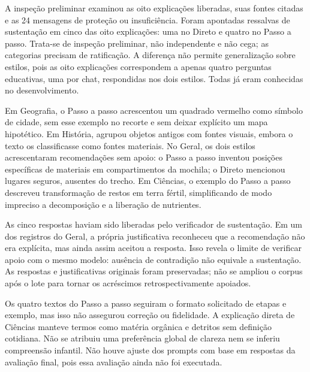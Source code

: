 \begin{table}[htbp]\centering\small\SingleSpacing
\caption{Rotas do lote GK-P2.1-dev, com denominador próprio}\label{tab:multichat}

\end{table}

A inspeção preliminar examinou as oito explicações liberadas, suas fontes citadas e as 24 mensagens de proteção ou insuficiência. Foram apontadas ressalvas de sustentação em cinco das oito explicações: uma no Direto e quatro no Passo a passo. Trata-se de inspeção preliminar, não independente e não cega; as categorias precisam de ratificação. A diferença não permite generalização sobre estilos, pois as oito explicações correspondem a apenas quatro perguntas educativas, uma por chat, respondidas nos dois estilos. Todas já eram conhecidas no desenvolvimento.

Em Geografia, o Passo a passo acrescentou um quadrado vermelho como símbolo de cidade, sem esse exemplo no recorte e sem deixar explícito um mapa hipotético. Em História, agrupou objetos antigos com fontes visuais, embora o texto os classificasse como fontes materiais. No Geral, os dois estilos acrescentaram recomendações sem apoio: o Passo a passo inventou posições específicas de materiais em compartimentos da mochila; o Direto mencionou lugares seguros, ausentes do trecho. Em Ciências, o exemplo do Passo a passo descreveu transformação de restos em terra fértil, simplificando de modo impreciso a decomposição e a liberação de nutrientes.

As cinco respostas haviam sido liberadas pelo verificador de sustentação. Em um dos registros do Geral, a própria justificativa reconheceu que a recomendação não era explícita, mas ainda assim aceitou a resposta. Isso revela o limite de verificar apoio com o mesmo modelo: ausência de contradição não equivale a sustentação. As respostas e justificativas originais foram preservadas; não se ampliou o corpus após o lote para tornar os acréscimos retrospectivamente apoiados.

Os quatro textos do Passo a passo seguiram o formato solicitado de etapas e exemplo, mas isso não assegurou correção ou fidelidade. A explicação direta de Ciências manteve termos como matéria orgânica e detritos sem definição cotidiana. Não se atribuiu uma preferência global de clareza nem se inferiu compreensão infantil. Não houve ajuste dos prompts com base em respostas da avaliação final, pois essa avaliação ainda não foi executada.

